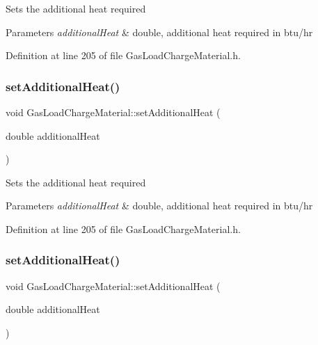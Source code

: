 Sets the additional heat required 
\begin{DoxyParams}{Parameters}
{\em additional\+Heat} & double, additional heat required in btu/hr \\
\hline
\end{DoxyParams}


Definition at line 205 of file Gas\+Load\+Charge\+Material.\+h.

\mbox{\label{class_gas_load_charge_material_a08ef5196ea9919dfc71be6744c7da08e}} 
\subsubsection{\texorpdfstring{set\+Additional\+Heat()}{setAdditionalHeat()}\hspace{0.1cm}{\footnotesize\ttfamily [2/3]}}
{\footnotesize\ttfamily void Gas\+Load\+Charge\+Material\+::set\+Additional\+Heat (\begin{DoxyParamCaption}\item[{double}]{additional\+Heat }\end{DoxyParamCaption})\hspace{0.3cm}{\ttfamily [inline]}}

Sets the additional heat required 
\begin{DoxyParams}{Parameters}
{\em additional\+Heat} & double, additional heat required in btu/hr \\
\hline
\end{DoxyParams}


Definition at line 205 of file Gas\+Load\+Charge\+Material.\+h.

\mbox{\label{class_gas_load_charge_material_a08ef5196ea9919dfc71be6744c7da08e}} 
\subsubsection{\texorpdfstring{set\+Additional\+Heat()}{setAdditionalHeat()}\hspace{0.1cm}{\footnotesize\ttfamily [3/3]}}
{\footnotesize\ttfamily void Gas\+Load\+Charge\+Material\+::set\+Additional\+Heat (\begin{DoxyParamCaption}\item[{double}]{additional\+Heat }\end{DoxyParamCaption})\hspace{0.3cm}{\ttfamily [inline]}}

